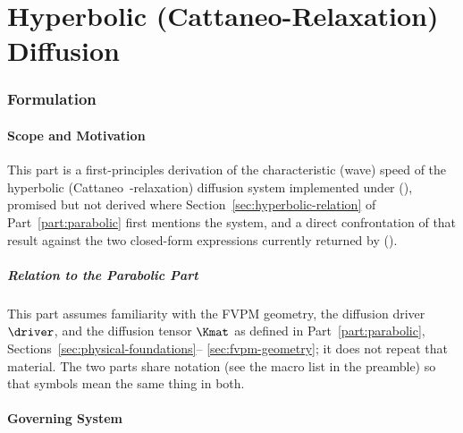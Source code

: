 
\part{Hyperbolic (Cattaneo-Relaxation) Diffusion}
\label{part:hyperbolic}

\section{Formulation}

\subsection{Scope and Motivation}
\label{sec:scope}

This part is a first-principles derivation of the characteristic (wave)
speed of the hyperbolic (Cattaneo~\citeyear{Cattaneo1948}-relaxation)
diffusion system implemented under
(), promised but not
derived where Section~\ref{sec:hyperbolic-relation} of
Part~\ref{part:parabolic} first mentions the system, and a direct
confrontation of that result against the two closed-form expressions
currently returned by
().

\subsubsection{Relation to the Parabolic Part}
This part assumes familiarity with the FVPM geometry, the diffusion
driver $\driver$, and the diffusion tensor $\Kmat$ as defined in
Part~\ref{part:parabolic}, Sections~\ref{sec:physical-foundations}--
\ref{sec:fvpm-geometry}; it does not repeat that material. The two parts
share notation (see the macro list in the preamble) so that symbols mean
the same thing in both.

\subsection{Governing System}
\label{sec:governing-system}

